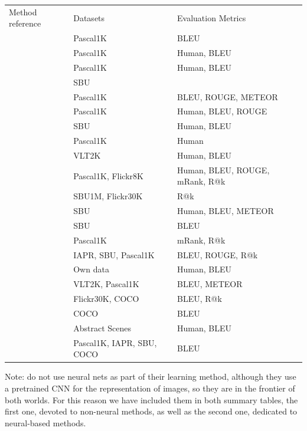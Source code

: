 \begin{table}[hpt]
    \caption{Summary of non neural methods, datasets and evaluation metrics}
    \label{tab:methods-datasets-metrics}
    \begin{longtable}{ p{50mm} | p{50mm} | p{60mm} }
        Method reference &  Datasets & Evaluation Metrics \\
        \citet{Farhadi2010} & Pascal1K & BLEU \\
        \citet{Kulkarni2011} & Pascal1K & Human, BLEU \\
        \citet{Li2011} & Pascal1K & Human, BLEU \\
        \citet{Ordonez2011} & SBU &  \\
        \citet{Yang2011} & Pascal1K & BLEU, ROUGE, METEOR \\
        \citet{Gupta2012} & Pascal1K & Human, BLEU, ROUGE \\
        \citet{Kuznetsova2012} & SBU & Human, BLEU \\
        \citet{Mitchell2012} & Pascal1K & Human \\
        \citet{Elliott2013} & VLT2K & Human, BLEU \\
        \citet{Hodosh2013b} & Pascal1K, Flickr8K & Human, BLEU, ROUGE, mRank, R@k \\
        \citet{Gong2014} & SBU1M, Flickr30K & R@k \\
        \citet{Kuznetsova2014} & SBU & Human, BLEU, METEOR \\
        \citet{Patterson2014} & SBU & BLEU \\
        \citet{Socher2014} & Pascal1K & mRank, R@k \\
        \citet{Verma2014} & IAPR, SBU, Pascal1K & BLEU, ROUGE, R@k \\
        \citet{Yatskar2014} & Own data & Human, BLEU \\
        \citet{Elliott2015} & VLT2K, Pascal1K & BLEU, METEOR \\
        \citet{Lebret2015a} & Flickr30K, COCO & BLEU, R@k \\
        \citet{Lebret2015b} & COCO & BLEU \\
        \citet{MateosOrtiz2015} & Abstract Scenes & Human, BLEU \\
        \citet{Ushiku2015} & Pascal1K, IAPR, SBU, COCO & BLEU \\
        \hline
    \end{longtable}
\end{table}

Note: \citep{Lebret2015a, Lebret2015b} do not use neural nets as part of their learning method, although they use a pretrained CNN for the representation of images, so they are in the frontier of both worlds. For this reason we have included them in both summary tables, the first one, devoted to non-neural methods, as well as the second one, dedicated to neural-based methods. 

